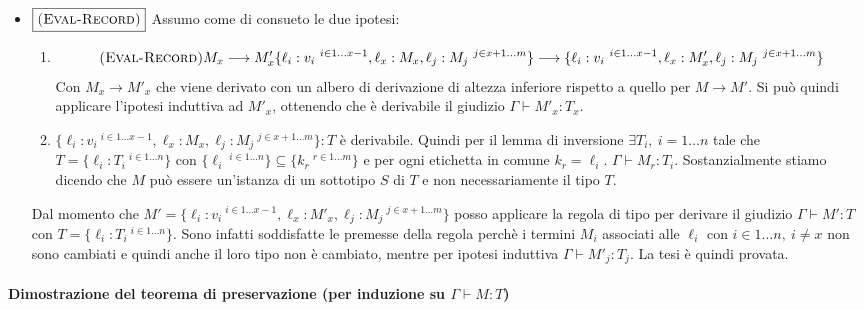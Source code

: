 \begin{itemize}
\begin{itemize}
		\item $\boxed{\textsc{(Eval-Record)}}$ 
		Assumo come di consueto le due ipotesi:
		\begin{enumerate}
			\item 
			$$
			{\textsc{(Eval-Record)}}
			{M_x \longrightarrow M_x'}
			{
				\{\ell_i : v_i\ ^{i \in 1 \dots x-1}, \ell_x : M_x, \ell_j : M_j\ ^{j \in x+1 \dots m}\} \longrightarrow
				\{\ell_i : v_i\ ^{i \in 1 \dots x-1}, \ell_x : M'_x, \ell_j : M_j\ ^{j \in x+1 \dots m}\}
			}
			$$
			Con $M_x \to M'_x$ che viene derivato con un albero di derivazione di altezza inferiore rispetto a quello per $M \to M'$.
			Si pu\`o quindi applicare l'ipotesi induttiva ad $M'_x$, ottenendo che \`e derivabile il giudizio $\Gamma \vdash M'_x : T_x$.
			\item $\{\ell_i : v_i\ ^{i \in 1 \dots x-1}, \ell_x : M_x, \ell_j : M_j\ ^{j \in x+1 \dots m}\} : T$ \`e derivabile.
			Quindi per il lemma di inversione $\exists T_i, \: i = 1 \dots n$ tale che 
			$T = \{\ell_i : T_i\ ^{i \in 1 \dots n} \}$ con $\{\ell_i\ ^{i \in 1 \dots n} \} \subseteq \{k_r\ ^{r \in 1 \dots m} \}$ 
			e per ogni etichetta in comune $k_r = \ell_i$. $\Gamma \vdash M_r : T_i$.
			Sostanzialmente stiamo dicendo che $M$ pu\`o essere un'istanza di un sottotipo $S$ di $T$ e non necessariamente il tipo $T$.
		\end{enumerate}
	
	Dal momento che $M' = \{\ell_i : v_i\ ^{i \in 1 \dots x-1}, \ell_x : M'_x, \ell_j : M_j\ ^{j \in x+1 \dots m}\}$ posso applicare la regola di tipo  per derivare il giudizio $\Gamma \vdash M' : T$ con $T = \{ \ell_i : T_i \:^{i \in 1 \ldots n} \}$.
	Sono infatti soddisfatte le premesse della regola perch\`e i termini $M_i$ associati alle $\ell_i$ con $i \in 1 \ldots n,\: i \neq x$ non sono cambiati e quindi anche il loro tipo non \`e cambiato, mentre per ipotesi induttiva $\Gamma \vdash M'_j : T_j$.
	La tesi \`e quindi provata.
	\end{itemize}
\end{itemize}

\paragraph{Dimostrazione del teorema di preservazione (per induzione su $\Gamma \vdash M : T$)}

